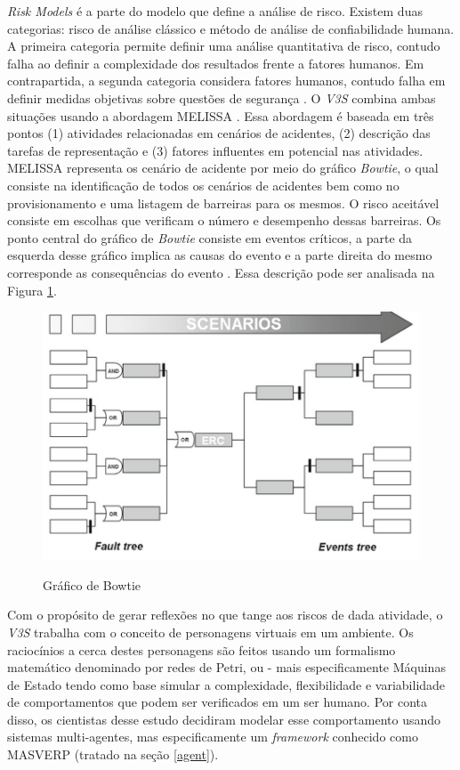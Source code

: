\textit{Risk Models} é a parte do modelo que define a análise de risco. Existem duas categorias: risco de análise clássico e método de análise de confiabilidade humana. A primeira categoria permite definir uma análise quantitativa de risco, contudo falha ao definir a complexidade dos resultados frente a fatores humanos. Em contrapartida, a segunda categoria considera fatores humanos, contudo falha em definir medidas objetivas sobre questões de segurança \cite{v3sframework}. O \textit{V3S} combina ambas situações usando a abordagem MELISSA \cite{melissaproject,v3sframework}. Essa abordagem é baseada em três pontos (1) atividades relacionadas em cenários de acidentes, (2) descrição das tarefas de representação e (3) fatores influentes em potencial nas atividades. MELISSA representa os cenário de acidente por meio do gráfico \textit{Bowtie}, o qual consiste na identificação de todos os cenários de acidentes bem como no provisionamento e uma listagem de barreiras para os mesmos. O risco aceitável consiste em escolhas que verificam o número e desempenho dessas barreiras. Os ponto central do gráfico de \textit{Bowtie} consiste em eventos críticos, a parte da esquerda desse gráfico implica as causas do evento e a parte direita do mesmo corresponde as consequências do evento \cite{v3sframework,melissaproject}. Essa descrição pode ser analisada na Figura \ref{bowtiegraf}. 


\begin{figure}[H]
  \centering
  \caption{Gráfico de Bowtie}
  \includegraphics[width=0.5\linewidth]{figure/bowtie.png}
  \begin{center}
  \cite{melissaproject}
  \end{center} 
  \label{bowtiegraf}
\end{figure}


Com o propósito de gerar reflexões no que tange aos riscos de dada atividade, o \textit{V3S} trabalha com o conceito de personagens virtuais em um ambiente. Os raciocínios a cerca destes personagens são feitos usando um formalismo matemático denominado por redes de Petri, ou - mais especificamente Máquinas de Estado \cite{v3sframework} tendo como base simular a complexidade, flexibilidade e variabilidade de comportamentos que podem ser verificados em um ser humano. Por conta disso, os cientistas desse estudo decidiram modelar esse comportamento usando sistemas multi-agentes, mas especificamente um \textit{framework} conhecido como MASVERP (tratado na seção \ref{agent}).

